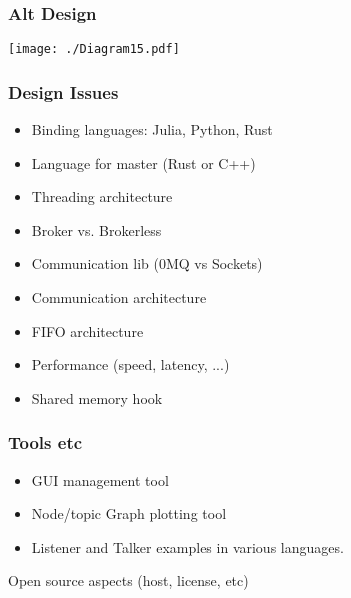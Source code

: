 \documentclass[xcolor=svgnames]{beamer}
\begin{document}
\begin{frame}[fragile]
  \frametitle{Alt Design}
\begin{center}
\texttt{[image: ./Diagram15.pdf]}
\end{center}
\end{frame}




\begin{frame}[fragile]
  \frametitle{Design Issues}

\begin{itemize}
\item Binding languages:  Julia, Python, Rust
\item Language for master (Rust or C++)
\item Threading architecture 
\item Broker vs. Brokerless
\item Communication lib (0MQ vs Sockets)
\item Communication architecture
\item FIFO architecture
\item Performance (speed, latency, ...)
\item Shared memory hook
\end{itemize}

\end{frame}


\begin{frame}[fragile]
  \frametitle{Tools etc}

\begin{itemize}
\item GUI management tool
\item Node/topic Graph plotting tool
\item Listener and Talker examples in various languages.
\end{itemize}
\vfill

Open source aspects (host, license, etc)

\end{frame}
\end{document}
